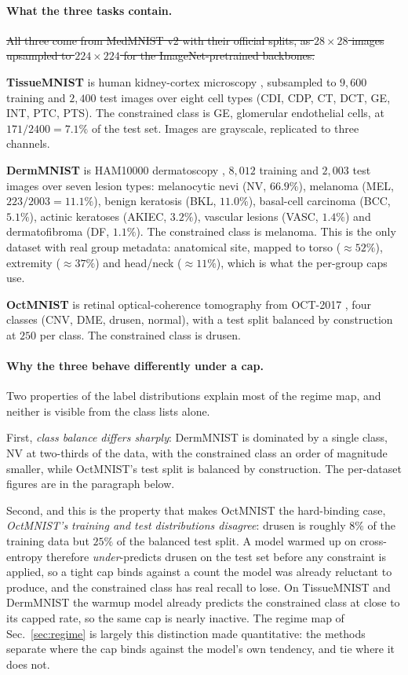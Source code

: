 \documentclass[10pt]{article}
\newcommand{\del}[1]{{\color{red}\sout{#1}}}
\begin{document}
{\color{blue}
\paragraph{What the three tasks contain.}
\del{All three come from MedMNIST v2 \mbox{\citep{yang2023medmnist}} with their official
splits, as $28{\times}28$ images upsampled to $224{\times}224$ for the
ImageNet-pretrained backbones.}

\textbf{TissueMNIST} is human kidney-cortex microscopy
\citep{woloshuk2021situ}, subsampled to $9{,}600$ training and $2{,}400$ test
images over eight cell types (CDI, CDP, CT, DCT, GE, INT, PTC, PTS). The
constrained class is GE, glomerular endothelial cells, at $171/2400 = 7.1\%$ of
the test set. Images are grayscale, replicated to three channels.

\textbf{DermMNIST} is HAM10000 dermatoscopy \citep{tschandl2018ham10000},
$8{,}012$ training and $2{,}003$ test images over seven lesion types: melanocytic
nevi (NV, $66.9\%$), melanoma (MEL, $223/2003 = 11.1\%$), benign keratosis (BKL, $11.0\%$),
basal-cell carcinoma (BCC, $5.1\%$), actinic keratoses (AKIEC, $3.2\%$),
vascular lesions (VASC, $1.4\%$) and dermatofibroma (DF, $1.1\%$). The
constrained class is melanoma. This is the only dataset with real group
metadata: anatomical site, mapped to torso ($\approx52\%$), extremity
($\approx37\%$) and head/neck ($\approx11\%$), which is what the per-group caps
use.

\textbf{OctMNIST} is retinal optical-coherence tomography from OCT-2017
\citep{kermany2018identifying}, four classes (CNV, DME, drusen, normal), with a
test split balanced by construction at $250$ per class. The
constrained class is drusen.

\paragraph{Why the three behave differently under a cap.}
Two properties of the label distributions explain most of the regime map, and
neither is visible from the class lists alone.

First, \emph{class balance differs sharply}: DermMNIST is dominated by a single
class, NV at two-thirds of the data, with the constrained class an order of
magnitude smaller, while OctMNIST's test split is balanced by construction. The
per-dataset figures are in the paragraph below.

Second, and this is the property that makes OctMNIST the hard-binding case,
\emph{OctMNIST's training and test distributions disagree}: drusen is roughly
$8\%$ of the training data but $25\%$ of the balanced test split. A model warmed
up on cross-entropy therefore \emph{under}-predicts drusen on the test set
before any constraint is applied, so a tight cap binds against a count the model
was already reluctant to produce, and the constrained class has real recall to
lose. On TissueMNIST and DermMNIST the warmup model already predicts the
constrained class at close to its capped rate, so the same cap is nearly
inactive. The regime map of Sec.~\ref{sec:regime} is largely this distinction
made quantitative: the methods separate where the cap binds against the model's
own tendency, and tie where it does not.

}
\end{document}
